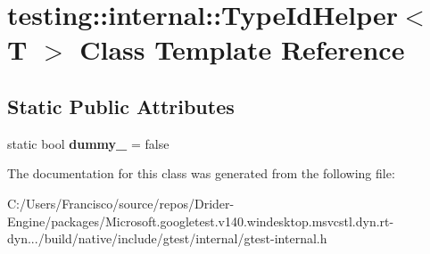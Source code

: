 \hypertarget{classtesting_1_1internal_1_1_type_id_helper}{}\section{testing\+:\+:internal\+:\+:Type\+Id\+Helper$<$ T $>$ Class Template Reference}
\label{classtesting_1_1internal_1_1_type_id_helper}
\subsection*{Static Public Attributes}
\begin{DoxyCompactItemize}
\item 
\mbox{\label{classtesting_1_1internal_1_1_type_id_helper_a372268b1520d965d0bdf01ebad3d270e}} 
static bool {\bfseries dummy\+\_\+} = false
\end{DoxyCompactItemize}


The documentation for this class was generated from the following file\+:\begin{DoxyCompactItemize}
\item 
C\+:/\+Users/\+Francisco/source/repos/\+Drider-\/\+Engine/packages/\+Microsoft.\+googletest.\+v140.\+windesktop.\+msvcstl.\+dyn.\+rt-\/dyn.../build/native/include/gtest/internal/gtest-\/internal.\+h\end{DoxyCompactItemize}
